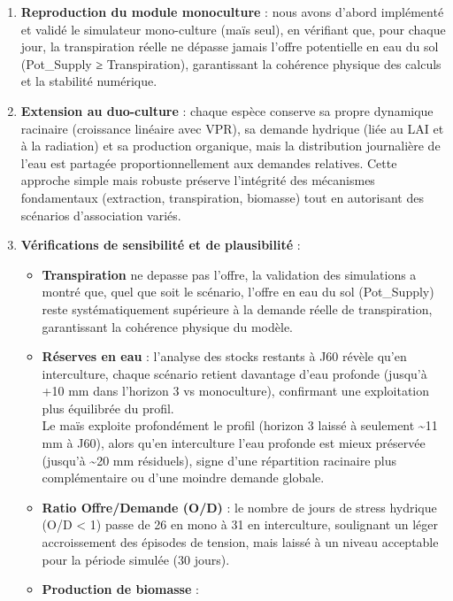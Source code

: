 \documentclass[
]{article}
\begin{document}
\begin{enumerate}
\def\labelenumi{\arabic{enumi}.}
\item
  \textbf{Reproduction du module monoculture} : nous avons d'abord
  implémenté et validé le simulateur mono-culture (maïs seul), en
  vérifiant que, pour chaque jour, la transpiration réelle ne dépasse
  jamais l'offre potentielle en eau du sol (Pot\_Supply ≥
  Transpiration), garantissant la cohérence physique des calculs et la
  stabilité numérique.
\item
  \textbf{Extension au duo-culture} : chaque espèce conserve sa propre
  dynamique racinaire (croissance linéaire avec VPR), sa demande
  hydrique (liée au LAI et à la radiation) et sa production organique,
  mais la distribution journalière de l'eau est partagée
  proportionnellement aux demandes relatives. Cette approche simple mais
  robuste préserve l'intégrité des mécanismes fondamentaux (extraction,
  transpiration, biomasse) tout en autorisant des scénarios
  d'association variés.
\item
  \textbf{Vérifications de sensibilité et de plausibilité} :

  \begin{itemize}
  \item
    \textbf{Transpiration} ne depasse pas l'offre, la validation des
    simulations a montré que, quel que soit le scénario, l'offre en eau
    du sol (Pot\_Supply) reste systématiquement supérieure à la demande
    réelle de transpiration, garantissant la cohérence physique du
    modèle.
  \item
    \textbf{Réserves en eau} : l'analyse des stocks restants à J60
    révèle qu'en interculture, chaque scénario retient davantage d'eau
    profonde (jusqu'à +10 mm dans l'horizon 3 vs monoculture),
    confirmant une exploitation plus équilibrée du profil.\\
    Le maïs exploite profondément le profil (horizon 3 laissé à
    seulement \textasciitilde11 mm à J60), alors qu'en interculture
    l'eau profonde est mieux préservée (jusqu'à \textasciitilde20 mm
    résiduels), signe d'une répartition racinaire plus complémentaire ou
    d'une moindre demande globale.
  \item
    \textbf{Ratio Offre/Demande (O/D)} : le nombre de jours de stress
    hydrique (O/D \textless{} 1) passe de 26 en mono à 31 en
    interculture, soulignant un léger accroissement des épisodes de
    tension, mais laissé à un niveau acceptable pour la période simulée
    (30 jours).
  \item
    \textbf{Production de biomasse} :


\end{itemize}
\end{enumerate}
\end{document}
